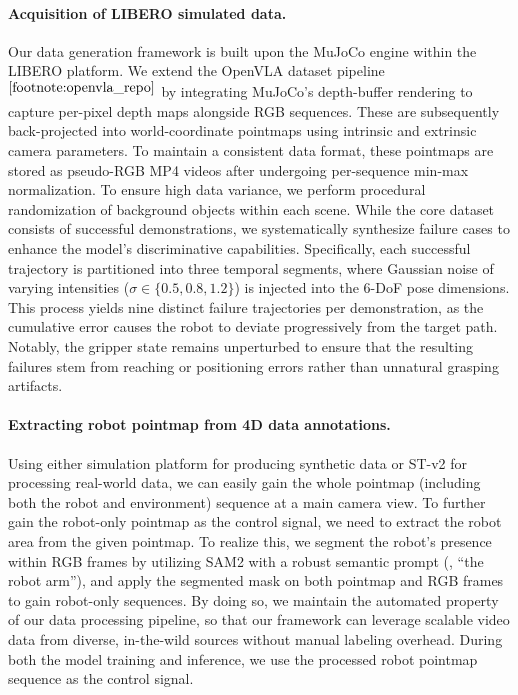 \begin{appendices}
\paragraph{Acquisition of LIBERO simulated data.}
Our data generation framework is built upon the MuJoCo \cite{todorov2012mujoco} engine within the LIBERO \cite{libero} platform. We extend the OpenVLA \cite{kim24openvla} dataset pipeline$^{\ref{footnote:openvla_repo}}$ by integrating MuJoCo’s depth-buffer rendering to capture per-pixel depth maps alongside RGB sequences. 
These are subsequently back-projected into world-coordinate pointmaps using intrinsic and extrinsic camera parameters. To maintain a consistent data format, these pointmaps are stored as pseudo-RGB MP4 videos after undergoing per-sequence min-max normalization. To ensure high data variance, we perform procedural randomization of background objects within each scene. While the core dataset consists of successful demonstrations, we systematically synthesize failure cases to enhance the model's discriminative capabilities. Specifically, each successful trajectory is partitioned into three temporal segments, where Gaussian noise of varying intensities ($\sigma \in \{0.5, 0.8, 1.2\}$) is injected into the 6-DoF pose dimensions. This process yields nine distinct failure trajectories per demonstration, as the cumulative error causes the robot to deviate progressively from the target path. Notably, the gripper state remains unperturbed to ensure that the resulting failures stem from reaching or positioning errors rather than unnatural grasping artifacts.

\paragraph{Extracting robot pointmap from 4D data annotations.}
Using either simulation platform for producing synthetic data or ST-v2 \cite{xiao2025spatialtracker} for processing real-world data, we can easily gain the whole pointmap (including both the robot and environment) sequence at a main camera view. To further gain the robot-only pointmap as the control signal, we need to extract the robot area from the given pointmap. To realize this, we segment the robot’s presence within RGB frames by utilizing SAM2 \cite{ravi2024sam2} with a robust semantic prompt (\eg, “the robot arm”), and apply the segmented mask on both pointmap and RGB frames to gain robot-only sequences. 
By doing so, we maintain the automated property of our data processing pipeline, so that our framework can leverage scalable video data from diverse, in-the-wild sources without manual labeling overhead. During both the model training and inference, we use the processed robot pointmap sequence as the control signal.


\end{appendices}
